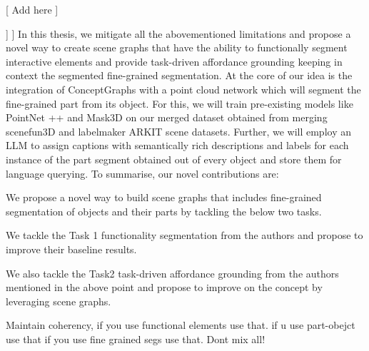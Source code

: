     [
        Add here
    ]
    
    ]
]
In this thesis, we mitigate all the abovementioned limitations and propose
a novel way to create scene graphs that have the ability to functionally segment
interactive elements and provide task-driven affordance grounding keeping in context the 
segmented fine-grained segmentation. At the core of our idea is the integration of ConceptGraphs with
a point cloud network which will segment the fine-grained part from its object. For this, we will train pre-existing 
models like PointNet ++ and Mask3D on our merged dataset obtained from merging scenefun3D and labelmaker
ARKIT scene datasets. Further, we will employ an LLM to assign captions with semantically rich descriptions and 
labels for each instance of the part segment obtained out of every object and store them for language querying. 
To summarise, our novel contributions are:
\begin{compactenum}[1.]
\item We propose a novel way to build scene graphs that includes fine-grained segmentation of objects and their parts by tackling the below two tasks.
\item We tackle the Task 1 functionality segmentation from the authors \citet{delitzas2024scenefun3d} and propose to improve their 
baseline results.
\item We also tackle the Task2 task-driven affordance grounding from the authors mentioned in the above point 
and propose to improve on the concept by leveraging scene graphs.
\end{compactenum}


Maintain coherency, if you use functional elements use that. if u use part-obejct use that if you use fine grained segs use that. Dont mix all!
